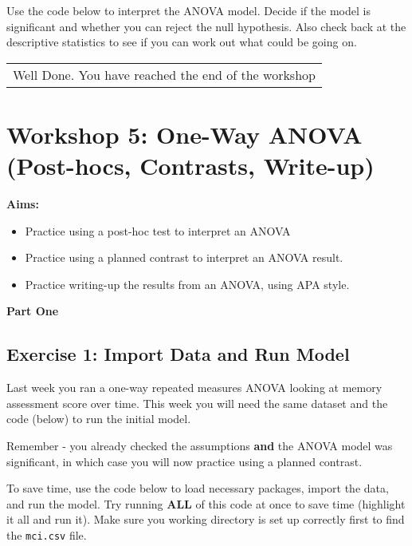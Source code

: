 \documentclass[
]{book}
\newenvironment{Shaded}{\begin{snugshade}}{\end{snugshade}}
\newcommand{\NormalTok}[1]{#1}
\newcommand{\SpecialCharTok}[1]{\textcolor[rgb]{0.81,0.36,0.00}{\textbf{#1}}}
\providecommand{\tightlist}{%
  \setlength{\itemsep}{0pt}\setlength{\parskip}{0pt}}
\let\oldsection\section
\renewcommand{\section}{\needspace{5\baselineskip}\oldsection}
\begin{document}
Use the code below to interpret the ANOVA model. Decide if the model is significant and whether you can reject the null hypothesis. Also check back at the descriptive statistics to see if you can work out what could be going on.

\begin{Shaded}
\end{Shaded}

\begin{longtable}[]{@{}l@{}}
\toprule\noalign{}
\endhead
\bottomrule\noalign{}
\endlastfoot
Well Done. You have reached the end of the workshop \\
\end{longtable}

\chapter{Workshop 5: One-Way ANOVA (Post-hocs, Contrasts, Write-up)}\label{workshop-5-one-way-anova-post-hocs-contrasts-write-up}

\textbf{Aims:}

\begin{itemize}
\tightlist
\item
  Practice using a post-hoc test to interpret an ANOVA
\item
  Practice using a planned contrast to interpret an ANOVA result.
\item
  Practice writing-up the results from an ANOVA, using APA style.
\end{itemize}

\textbf{Part One}

\section{Exercise 1: Import Data and Run Model}\label{exercise-1-import-data-and-run-model}

Last week you ran a one-way repeated measures ANOVA looking at memory assessment score over time. This week you will need the same dataset and the code (below) to run the initial model.

Remember - you already checked the assumptions \textbf{and} the ANOVA model was significant, in which case you will now practice using a planned contrast.

To save time, use the code below to load necessary packages, import the data, and run the model. Try running \textbf{ALL} of this code at once to save time (highlight it all and run it). Make sure you working directory is set up correctly first to find the \texttt{mci.csv} file.
\end{document}
